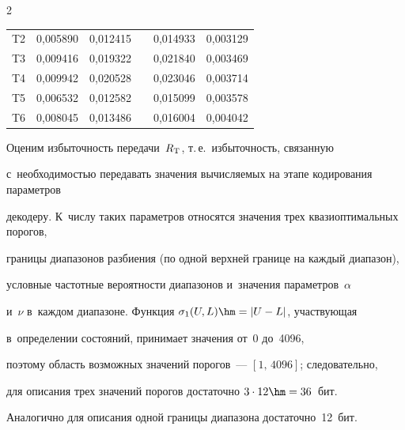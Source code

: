 \begin{multicols}{2}
\begin{table}[b]
\begin{center}
\begin{tabular}{|c|c|c|c|c|c|}

T2 & 0,005890 & 0,012415 &                      & 0,014933 & 0,003129\\


T3 & 0,009416 & 0,019322 &                      & 0,021840 & 0,003469\\


T4 & 0,009942 & 0,020528 &                      & 0,023046 & 0,003714\\


T5 & 0,006532 & 0,012582 &                      & 0,015099 & 0,003578\\


T6 & 0,008045 & 0,013486 &                      & 0,016004 & 0,004042\\

\hline

\end{tabular}

\end{center}

\end{table}





Оценим избыточность передачи~$R_{\rm T}$, т.\,е.\ избыточность, связанную 

с~необходимостью передавать значения вычисляемых на этапе кодирования параметров

 декодеру. К~числу таких параметров относятся значения трех квазиоптимальных порогов, 

 границы диапазонов разбиения (по одной верхней границе на каждый диапазон), 

 условные частотные вероятности диапазонов и~значения параметров~$\alpha$  

 и~$\nu$ в~каждом диапазоне. Функция $\sigma_1(U,L)\hm= |U-L|$, участвующая 

 в~определении состояний, принимает значения от~0 до~4096, 

 поэтому область возможных значений порогов~--- $[1,\,4096]$; следовательно, 

 для описания трех значений порогов достаточно $3\cdot 12\hm=36$~бит. 

 Аналогично для описания одной границы диапазона достаточно~12~бит. 


\end{multicols}

